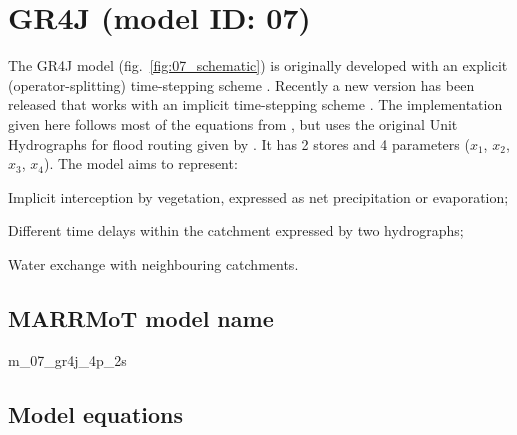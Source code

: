 \section{GR4J (model ID: 07)}
The GR4J model (fig.~\ref{fig:07_schematic}) is originally developed with an explicit (operator-splitting) time-stepping scheme \citep{Perrin2003}. Recently a new version has been released that works with an implicit time-stepping scheme \citep{Santos2017}. The implementation given here follows most of the equations from \citet{Santos2017}, but uses the original Unit Hydrographs for flood routing given by \citet{Perrin2003}. It has 2 stores and 4 parameters ($x_1$, $x_2$, $x_3$, $x_4$). The model aims to represent:

\begin{itemizecompact}
\item Implicit interception by vegetation, expressed as net precipitation or evaporation;
\item Different time delays within the catchment expressed by two hydrographs;
\item Water exchange with neighbouring catchments.
\end{itemizecompact}

\subsection{MARRMoT model name}
m\_07\_gr4j\_4p\_2s \\

\subsection{Model equations}

